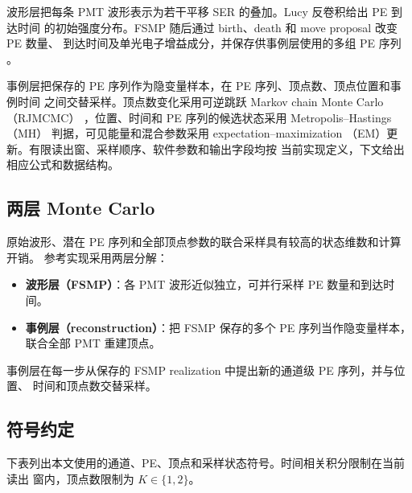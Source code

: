 \documentclass[UTF8,a4paper,11pt]{ctexart}
\providecommand{\tightlist}{%
  \setlength{\itemsep}{0pt}\setlength{\parskip}{0pt}}
\begin{document}
波形层把每条 PMT 波形表示为若干平移 SER 的叠加。Lucy 反卷积给出 PE 到达时间
的初始强度分布。FSMP 随后通过 birth、death 和 move proposal 改变 PE 数量、
到达时间及单光电子增益成分，并保存供事例层使用的多组 PE 序列
\cite{lucy1974,wang2026fsmp}。

事例层把保存的 PE 序列作为隐变量样本，在 PE 序列、顶点数、顶点位置和事例时间
之间交替采样。顶点数变化采用可逆跳跃 Markov chain Monte Carlo（RJMCMC）
\cite{green1995}，位置、时间和 PE 序列的候选状态采用 Metropolis--Hastings（MH）
判据\cite{hastings1970}，可见能量和混合参数采用 expectation--maximization
（EM）更新\cite{dempster1977}。有限读出窗、采样顺序、软件参数和输出字段均按
当前实现定义，下文给出相应公式和数据结构。

\subsection{两层 Monte Carlo}

原始波形、潜在 PE 序列和全部顶点参数的联合采样具有较高的状态维数和计算开销。
参考实现采用两层分解：

\begin{itemize}
\tightlist
\item
  \textbf{波形层（FSMP）}：各 PMT 波形近似独立，可并行采样 PE 数量和到达时间。
\item
  \textbf{事例层（reconstruction）}：把 FSMP 保存的多个 PE 序列当作隐变量样本，联合全部 PMT 重建顶点。
\end{itemize}

事例层在每一步从保存的 FSMP realization 中提出新的通道级 PE 序列，并与位置、
时间和顶点数交替采样。

\subsection{符号约定}

下表列出本文使用的通道、PE、顶点和采样状态符号。时间相关积分限制在当前读出
窗内，顶点数限制为 \(K\in\{1,2\}\)。
\end{document}

